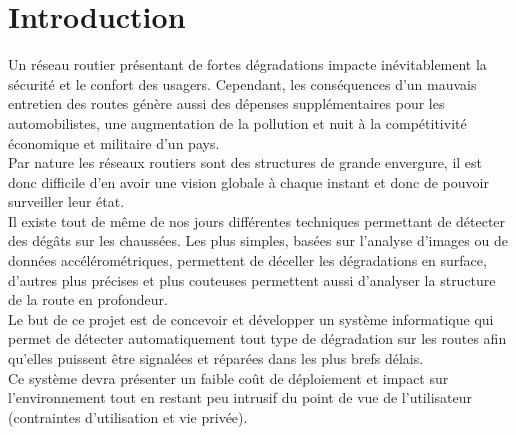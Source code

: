 \section{Introduction}
Un réseau routier présentant de fortes dégradations impacte inévitablement la sécurité et le confort des usagers. Cependant, les conséquences d'un mauvais entretien des routes génère aussi des dépenses supplémentaires pour les automobilistes, une augmentation de la pollution et nuit à la compétitivité économique et militaire d'un pays.\\

Par nature les réseaux routiers sont des structures de grande envergure, il est donc difficile d'en avoir une vision globale à chaque instant et donc de pouvoir surveiller leur état.\\
Il existe tout de même de nos jours différentes techniques permettant de détecter des dégâts sur les chaussées. Les plus simples, basées sur l'analyse d'images ou de données accélérométriques, permettent de déceller les dégradations en surface, d'autres plus précises et plus couteuses permettent aussi d'analyser la structure de la route en profondeur.\\

Le but de ce projet est de concevoir et développer un système informatique qui permet de détecter automatiquement tout type de dégradation sur les routes afin qu'elles puissent être signalées et réparées dans les plus brefs délais.\\
Ce système devra présenter un faible coût de déploiement et impact sur l'environnement tout en restant peu intrusif du point de vue de l'utilisateur (contraintes d'utilisation et vie privée).